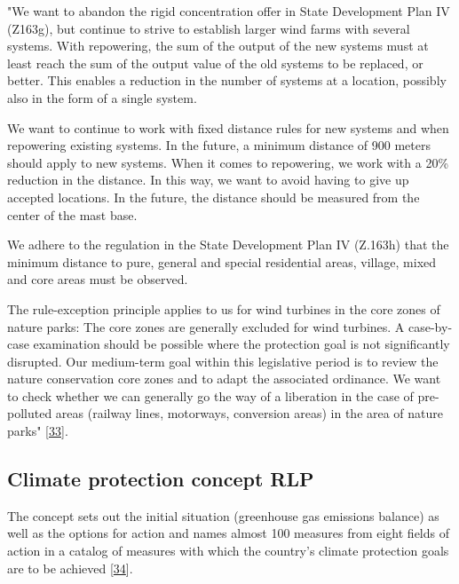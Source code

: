 \documentclass[a4paper,11pt]{article}
\begin{document}
"We want to abandon the rigid concentration offer in State Development Plan IV (Z163g), but continue to strive to establish larger wind farms with several systems. With repowering, the sum of the output of the new systems must at least reach the sum of the output value of the old systems to be replaced, or better. This enables a reduction in the number of systems at a location, possibly also in the form of a single system.

We want to continue to work with fixed distance rules for new systems and when repowering existing systems. In the future, a minimum distance of 900 meters should apply to new systems. When it comes to repowering, we work with a 20\% reduction in the distance. In this way, we want to avoid having to give up accepted locations. In the future, the distance should be measured from the center of the mast base.

We adhere to the regulation in the State Development Plan IV (Z.163h) that the minimum distance to pure, general and special residential areas, village, mixed and core areas must be observed.

The rule-exception principle applies to us for wind turbines in the core zones of nature parks: The core zones are generally excluded for wind turbines. A case-by-case examination should be possible where the protection goal is not significantly disrupted. Our medium-term goal within this legislative period is to review the nature conservation core zones and to adapt the associated ordinance. We want to check whether we can generally go the way of a liberation in the case of pre-polluted areas (railway lines, motorways, conversion areas) in the area of nature parks" {[}\protect\hyperlink{ref-SPD.2021}{33}{]}.

\hypertarget{climate-protection-concept-rlp}{%
\subsection{Climate protection concept RLP}\label{climate-protection-concept-rlp}}

The concept sets out the initial situation (greenhouse gas emissions balance) as well as the options for action and names almost 100 measures from eight fields of action in a catalog of measures with which the country's climate protection goals are to be achieved {[}\protect\hyperlink{ref-MinisteriumfurUmweltEnergieErnahrungundForsten.2020b}{34}{]}.
\end{document}
